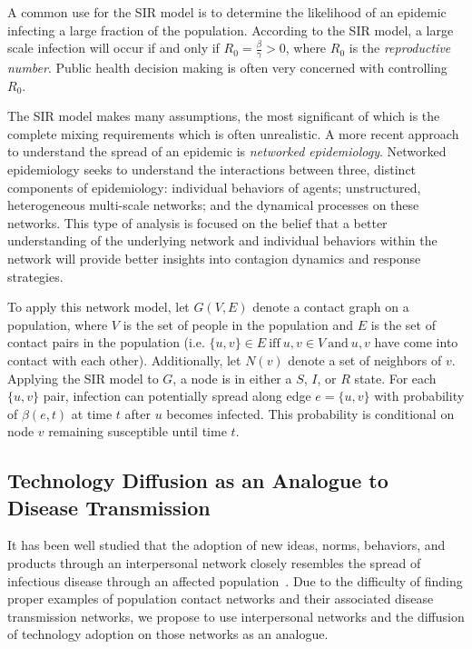 \documentclass[12pt, oneside, openany]{article} %
\begin{document}
A common use for the SIR model is to determine the likelihood of an epidemic infecting a large fraction of the population. According to the SIR model, a large scale infection will occur if and only if $R_{0} = \frac{\beta}{\gamma} > 0 $, where $R_{0}$ is the \textit{reproductive number}. Public health decision making is often very concerned with controlling $R_{0}$.

The SIR model makes many assumptions, the most significant of which is the complete mixing requirements which is often unrealistic. A more recent approach to understand the spread of an epidemic is \textit{networked epidemiology}. Networked epidemiology seeks to understand the interactions between three, distinct components of epidemiology: individual behaviors of agents; unstructured, heterogeneous multi-scale networks; and the dynamical processes on these networks. This type of analysis is focused on the belief that a better understanding of the underlying network and individual behaviors within the network will provide better insights into contagion dynamics and response strategies. 

To apply this network model, let $G(V, E)$ denote a contact graph on a population, where $V$ is the set of people in the population and $E$ is the set of contact pairs in the population (i.e. $\{u,v\}\in E~ \mathrm{iff}~u,v\in V~\mathrm{and}~u,v$ have come into contact with each other). Additionally, let $N(v)$ denote a set of neighbors of $v$. Applying the SIR model to $G$, a node is in either a $S$, $I$, or $R$ state. For each $\{u,v\}$ pair, infection can potentially spread along edge $e = \{u, v\}$ with probability of $ \beta(e,t) $ at time $t$ after $u$ becomes infected. This probability is conditional on node $v$ remaining susceptible until time $t$.~\cite{marathe} 

\subsection{Technology Diffusion as an Analogue to Disease Transmission}
It has been well studied that the adoption of new ideas, norms, behaviors, and products through an interpersonal network closely resembles the spread of infectious disease through an affected population~\cite{goel}. Due to the difficulty of finding proper examples of population contact networks and their associated disease transmission networks, we propose to use interpersonal networks and the diffusion of technology adoption on those networks as an analogue.
\end{document}
